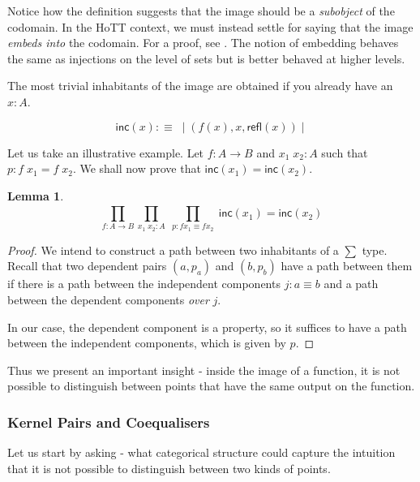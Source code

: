 \documentclass{article}
\newcommand{\id}[1]{\mathsf{#1}}
\newtheorem{lemma}{Lemma}
\begin{document}
Notice how the definition suggests that the image should be a \emph{subobject} of the codomain. 
In the HoTT context, we must instead settle for saying that the image \emph{embeds into} the codomain. For a proof, see \citep{The_Agda_Community_Cubical_Agda_Library_2023}. 
The notion of embedding behaves the same as injections on the level of sets but is better behaved at higher levels. 

The most trivial inhabitants of the image are obtained if you already have an $x : A$. 

\begin{equation*}
    \id{inc}(x) :\equiv \; \mid (f (x) , x , \id{refl}(x)) \mid 
\end{equation*}

Let us take an illustrative example. Let $f : A \to B$ and $x_1 \; x_2 : A$ such that $p : f \; x_1 = f \; x_2$. 
We shall now prove that $\id{inc}(x_1) = \id{inc}(x_2)$.

\begin{lemma}
    \begin{equation*}
        \prod_{f : A \to B}^{} \prod_{x_1 \; x_2 : A}^{} \; \prod_{p : f x_1 \equiv f x_2} \; \id{inc}(x_1) = \id{inc}(x_2)    
    \end{equation*}
    
\end{lemma}

\begin{proof}
    We intend to construct a path between two inhabitants of a $\sum$ type. 
    Recall that two dependent pairs $(a, p_a)$ and $(b,p_b)$ have a path between them if there is a path between the independent components $j : a \equiv b$ and a path between the dependent components \emph{over} $j$. 

    In our case, the dependent component is a property, so it suffices to have a path between the independent components, which is given by $p$.
\end{proof}

Thus we present an important insight - inside the image of a function, it is not possible to distinguish between points that have the same output on the function.

\subsubsection{Kernel Pairs and Coequalisers}

Let us start by asking - what categorical structure could capture the intuition that it is not possible to distinguish between two kinds of points. 
\end{document}
